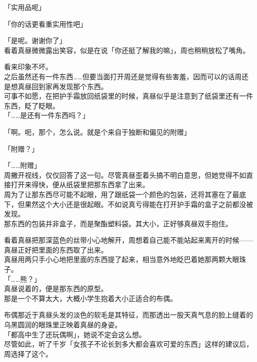 「实用品呢」

「你的话更看重实用性吧」

「是呢。谢谢你了」\\

看着真昼微微露出笑容，似是在说「你还挺了解我的嘛」，周也稍稍放松了嘴角。

看来印象不坏。\\

之后虽然还有一件东西……但要当面打开周还是觉得有些害羞，因而可以的话周还是想真昼回到家再发现那个东西。\\

可事不如愿，在把护手霜放回纸袋里的时候，真昼似乎是注意到了纸袋里还有一件东西，眨了眨眼。\\

「……是还有一件东西吗？」

「啊。呃，那个，怎么说。就是个来自于独断和偏见的附赠」

「附赠？」

「……附赠」\\

周撇开视线，仅仅回答了这一句。尽管真昼歪着头搞不明白意思，但她觉得不如直接打开来得快，便从纸袋里把那东西拿了出来。\\

周为了让那东西尽可能不起眼，用了跟纸袋一个颜色的包装，还将其塞在了最底下，但果然这个大小还是很起眼。不如说真亏得能在打开护手霜的盒子之前都没被发现。\\

那东西的包装并非盒子，而是聚酯塑料袋。其大小，正好够真昼双手抱住。

看着真昼把那深蓝色的丝带小心地解开，周想着自己能不能站起来离开的时候——真昼正好把里面的东西取了出来。\\

真昼用两只手小心地把里面的东西提了起来，相当意外地眨巴着她那两颗大眼珠子。\\

「……熊？」\\

真昼说着的，便是那东西的原型。\\

那是一个不算太大，大概小学生抱着大小正适合的布偶。

布偶那近于真昼头发的淡色的软毛是其特征，而那透出一股天真气息的脸上缝着的乌黑圆润的眼珠里正映着真昼的身姿。\\

「都高中生了还玩偶啊」，她说不定会这么想。\\

尽管如此，听了千岁「女孩子不论长到多大都会喜欢可爱的东西」这样的建议后，周选择了这个。\\

